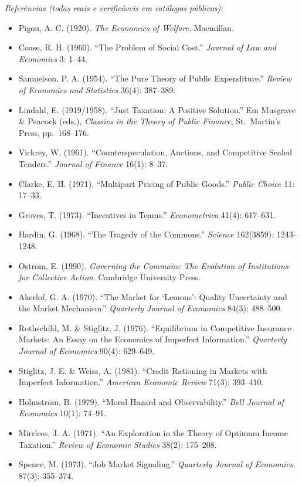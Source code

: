 \documentclass[11pt,addpoints]{exam}
\begin{document}
\begin{contextbox}
\medskip
\textit{Referências (todas reais e verificáveis em catálogos públicos):}
\begin{itemize}[noitemsep,topsep=0pt]
\item Pigou, A. C. (1920). \textit{The Economics of Welfare}. Macmillan.
\item Coase, R. H. (1960). ``The Problem of Social Cost.'' \textit{Journal of Law and Economics} 3: 1--44.
\item Samuelson, P. A. (1954). ``The Pure Theory of Public Expenditure.'' \textit{Review of Economics and Statistics} 36(4): 387--389.
\item Lindahl, E. (1919/1958). ``Just Taxation: A Positive Solution.'' Em Musgrave \& Peacock (eds.), \textit{Classics in the Theory of Public Finance}, St.~Martin's Press, pp.~168--176.
\item Vickrey, W. (1961). ``Counterspeculation, Auctions, and Competitive Sealed Tenders.'' \textit{Journal of Finance} 16(1): 8--37.
\item Clarke, E. H. (1971). ``Multipart Pricing of Public Goods.'' \textit{Public Choice} 11: 17--33.
\item Groves, T. (1973). ``Incentives in Teams.'' \textit{Econometrica} 41(4): 617--631.
\item Hardin, G. (1968). ``The Tragedy of the Commons.'' \textit{Science} 162(3859): 1243--1248.
\item Ostrom, E. (1990). \textit{Governing the Commons: The Evolution of Institutions for Collective Action}. Cambridge University Press.
\item Akerlof, G. A. (1970). ``The Market for `Lemons': Quality Uncertainty and the Market Mechanism.'' \textit{Quarterly Journal of Economics} 84(3): 488--500.
\item Rothschild, M. \& Stiglitz, J. (1976). ``Equilibrium in Competitive Insurance Markets: An Essay on the Economics of Imperfect Information.'' \textit{Quarterly Journal of Economics} 90(4): 629--649.
\item Stiglitz, J. E. \& Weiss, A. (1981). ``Credit Rationing in Markets with Imperfect Information.'' \textit{American Economic Review} 71(3): 393--410.
\item Holmström, B. (1979). ``Moral Hazard and Observability.'' \textit{Bell Journal of Economics} 10(1): 74--91.
\item Mirrlees, J. A. (1971). ``An Exploration in the Theory of Optimum Income Taxation.'' \textit{Review of Economic Studies} 38(2): 175--208.
\item Spence, M. (1973). ``Job Market Signaling.'' \textit{Quarterly Journal of Economics} 87(3): 355--374.

\end{itemize}
\end{contextbox}
\end{document}
